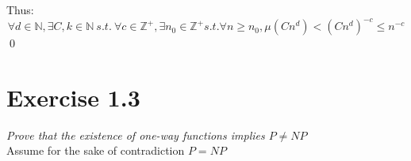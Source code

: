 \documentclass[11pt]{article}
\begin{document}
Thus:
$$
\forall d \in \mathbb{N}, \exists C,k \in \mathbb{N}\ s.t.\  \forall c \in \mathbb{Z}^{+}, \exists n_0 \in \mathbb{Z}^{+} s.t. \forall n \geq n_0, \mu(Cn^d) < (Cn^d)^{-c} \leq n^{-c}
$$ \qed

\section*{Exercise 1.3}

\textit{Prove that the existence of one-way functions implies $P \neq NP$} \\

Assume for the sake of contradiction $P = NP$
\end{document}
